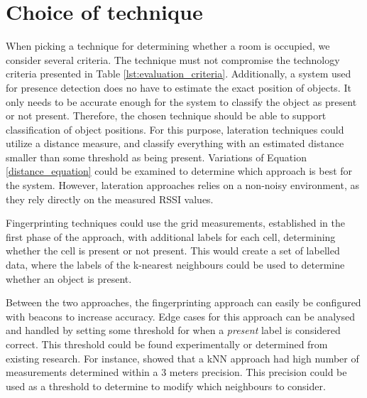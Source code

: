 \section{Choice of technique}
When picking a technique for determining whether a room is occupied, we consider several criteria.
The technique must not compromise the technology criteria presented in Table \ref{lst:evaluation_criteria}.
Additionally, a system used for presence detection does no have to estimate the exact position of objects.
It only needs to be accurate enough for the system to classify the object as present or not present.
Therefore, the chosen technique should be able to support classification of object positions.  
For this purpose, lateration techniques could utilize a distance measure, and classify everything with an estimated distance smaller than some threshold as being present.
Variations of Equation \ref{distance_equation} could be examined to determine which approach is best for the system.
However, lateration approaches relies on a non-noisy environment, as they rely directly on the measured RSSI values.

Fingerprinting techniques could use the grid measurements, established in the first phase of the approach, with additional labels for each cell, determining whether the cell is present or not present.
This would create a set of labelled data, where the labels of the k-nearest neighbours could be used to determine whether an object is present. 

Between the two approaches, the fingerprinting approach can easily be configured with beacons to increase accuracy.
Edge cases for this approach can be analysed and handled by setting some threshold for when a \textit{present} label is considered correct. 
This threshold could be found experimentally or determined from existing research. 
For instance, \citeauthor{ble_kneares_neural}\cite{ble_kneares_neural} showed that a kNN approach had high number of measurements determined within a 3 meters precision. 
This precision could be used as a threshold to determine to modify which neighbours to consider.    
